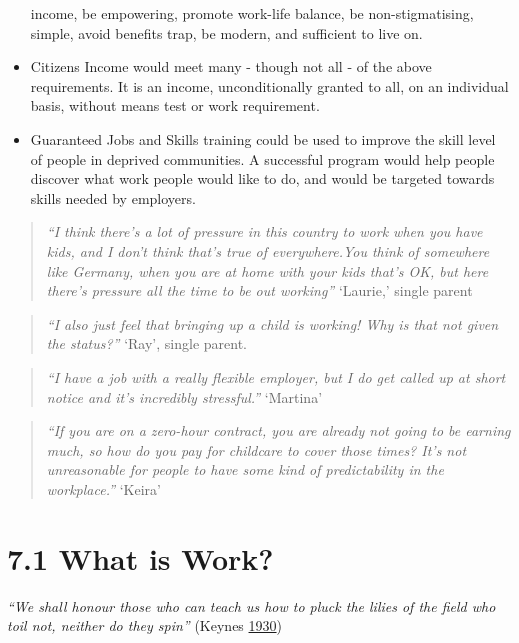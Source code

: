 \documentclass[]{tufte-handout}
\begin{document}
\begin{itemize}
  income, be empowering, promote work-life balance, be non-stigmatising,
  simple, avoid benefits trap, be modern, and sufficient to live on.
\item
  Citizens Income would meet many - though not all - of the above
  requirements. It is an income, unconditionally granted to all, on an
  individual basis, without means test or work requirement.
\item
  Guaranteed Jobs and Skills training could be used to improve the skill
  level of people in deprived communities. A successful program would
  help people discover what work people would like to do, and would be
  targeted towards skills needed by employers.
\end{itemize}

\begin{quote}
\emph{``I think there's a lot of pressure in this country to work when
you have kids, and I don't think that's true of everywhere.You think of
somewhere like Germany, when you are at home with your kids that's OK,
but here there's pressure all the time to be out working''} `Laurie,'
single parent
\end{quote}

\begin{quote}
\emph{``I also just feel that bringing up a child is working! Why is
that not given the status?''} `Ray', single parent.
\end{quote}

\begin{quote}
\emph{``I have a job with a really flexible employer, but I do get
called up at short notice and it's incredibly stressful.''} `Martina'
\end{quote}

\begin{quote}
\emph{``If you are on a zero-hour contract, you are already not going to
be earning much, so how do you pay for childcare to cover those times?
It's not unreasonable for people to have some kind of predictability in
the workplace.''} `Keira'
\end{quote}

\hypertarget{what-is-work}{%
\section{7.1 What is Work?}\label{what-is-work}}

\emph{``We shall honour those who can teach us how to pluck the lilies
of the field who toil not, neither do they spin''} (Keynes
\protect\hyperlink{ref-Keynes1930}{1930})
\end{document}
